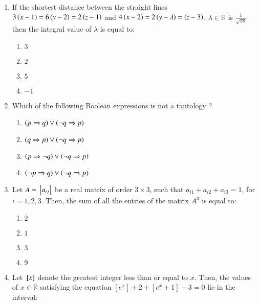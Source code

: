 \documentclass[journal]{IEEEtran}
\begin{document}
\begin{enumerate}
{\begin{multicols}{4}
\begin{enumerate}
\item $\lambda = 3, \mu = 5$
\item $\lambda = 3, \mu \neq 10$
\item $\lambda \neq 2, \mu = 10$
\item $\lambda = 2, \mu \neq 10$
\end{enumerate}
\end{multicols}
}
\item{
If the shortest distance between the straight lines $3\left(x-1\right)=6\left(y-2\right)=2\left(z-1\right)$ and $4\left(x-2\right)=2\left(y-\lambda\right)=\left(z-3\right)$, $\lambda \in \mathbb{R}$ is $\frac{1}{\sqrt{38}}$then the integral value of $\lambda$ is equal to:
\begin{multicols}{4}
\begin{enumerate}
\item $3$
\item $2$
\item $5$
\item $-1$
\end{enumerate}
\end{multicols}
}
\item{
Which of the following Boolean expressions is not a tautology ?
\begin{multicols}{2}
\begin{enumerate}
\item $\left(p \Rightarrow q\right) \lor \left(\neg q \Rightarrow p\right)$
\item $\left(q \Rightarrow p\right) \lor \left(\neg q \Rightarrow p\right)$
\item $\left(p \Rightarrow \neg q\right) \lor \left(\neg q \Rightarrow p\right)$
\item $\left(\neg p \Rightarrow q\right) \lor \left(\neg q \Rightarrow p\right)$
\end{enumerate}
\end{multicols}
}
\item{
Let $A={}\left[a_{ij}\right]$ be a real matrix of order $3 \times 3$, such that $a_{i1}+a_{i2}+a_{i3}=1$, for $i=1,2,3$. Then, the sum of all the entries of the matrix $A^3$ is equal to:
\begin{multicols}{4}
\begin{enumerate}
\item $2$
\item $1$
\item $3$
\item $9$
\end{enumerate}
\end{multicols}
}
\item{
Let ${}\left[x\right]$ denote the greatest integer less than or equal to $x$. Then, the values of $x \in \mathbb{R}$ satisfying the equation $[e^x] + 2 + [e^{x}+1] - 3 = 0$ lie in the interval:
}
\end{enumerate}
\end{document}
